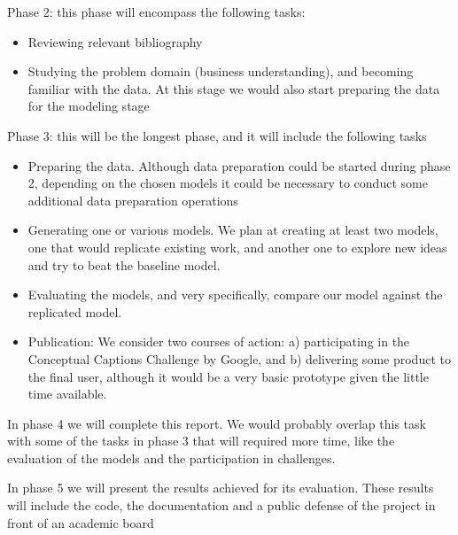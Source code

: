 Phase 2: this phase will encompass the following tasks:
\begin{itemize}
\item Reviewing relevant bibliography
\item Studying the problem domain (business understanding), and becoming familiar with the data. At this stage we would also start preparing the data for the modeling stage
\end{itemize}

Phase 3: this will be the longest phase, and it will include the following tasks  
\begin{itemize}
\item Preparing the data. Although data preparation could be started during phase 2, depending on the chosen models it could be necessary to conduct some additional data preparation operations
\item Generating one or various models. We plan at creating at least two models, one that would replicate existing work, and another one to explore new ideas and try to beat the baseline model.
\item Evaluating the models, and very specifically, compare our model against the replicated model.
\item Publication: We consider two courses of action: a) participating in the Conceptual Captions Challenge by Google, and b) delivering some product to the final user, although it would be a very basic prototype given the little time available.
\end{itemize}

In phase 4 we will complete this report. We would probably overlap this task with some of the tasks in phase 3 that will required more time, like the evaluation of the models and the participation in challenges.

In phase 5 we will present the results achieved for its evaluation. These results will include the code, the documentation and a public defense of the project in front of an academic board

